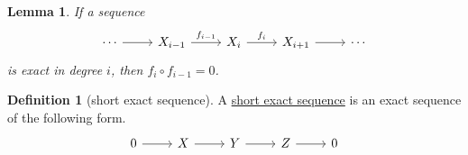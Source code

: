 \documentclass[a4paper,10pt]{scrreprt}
\newcommand{\defn}[1]{\ul{#1}}
\theoremstyle{definition}
\newtheorem{definition}{Definition}[section]
\theoremstyle{plain}
\newtheorem{lemma}{Lemma}[section]
\theoremstyle{remark}
\begin{document}
\begin{lemma}
  If a sequence
  \begin{equation*}
    \begin{tikzcd}
      \cdots
      \arrow[r]
      & X_{i-1}
      \arrow[r, "f_{i-1}"]
      & X_{i}
      \arrow[r, "f_{i}"]
      & X_{i+1}
      \arrow[r]
      & \cdots
    \end{tikzcd}
  \end{equation*}
  is exact in degree $i$, then $f_{i} \circ f_{i-1} = 0$.
\end{lemma}

\begin{definition}[short exact sequence]
  \label{def:shortexactsequence}
  A \defn{short exact sequence} is an exact sequence of the following form.
  \begin{equation*}
    \begin{tikzcd}
      0
      \arrow[r]
      & X
      \arrow[r]
      & Y
      \arrow[r]
      & Z
      \arrow[r]
      & 0
    \end{tikzcd}
  \end{equation*}
\end{definition}

\end{document}
